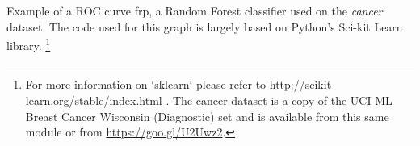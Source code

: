 Example of a ROC curve frp, a Random Forest classifier used on the \textit{cancer} dataset.  The code used for this graph is largely based on Python's Sci-kit Learn library. \footnote{For more information on `sklearn` please refer to \url{http://scikit-learn.org/stable/index.html} \cite{sci-kit} . The cancer dataset is a copy of the UCI ML Breast Cancer Wisconsin (Diagnostic) set and is available from this same module or from \url{https://goo.gl/U2Uwz2}.}
